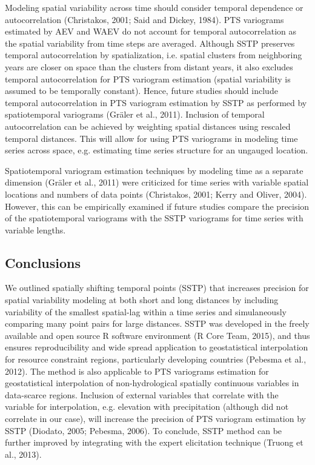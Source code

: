 Modeling spatial variability across time should consider temporal dependence or autocorrelation (Christakos, 2001; Said and Dickey, 1984). PTS variograms estimated by AEV and WAEV do not account for temporal autocorrelation as the spatial variability from time steps are averaged. Although SSTP preserves temporal autocorrelation by spatialization, i.e. spatial clusters from neighboring years are closer on space than the clusters from distant years, it also excludes temporal autocorrelation for PTS variogram estimation (spatial variability is assumed to be temporally constant). Hence, future studies should include temporal autocorrelation in PTS variogram estimation by SSTP as performed by spatiotemporal variograms (Gräler et al., 2011). Inclusion of temporal autocorrelation can be achieved by weighting spatial distances using rescaled temporal distances. This will allow for using PTS variograms in modeling time series across space, e.g. estimating time series structure for an ungauged location.

Spatiotemporal variogram estimation techniques by modeling time as a separate dimension (Gräler et al., 2011) were criticized for time series with variable spatial locations and numbers of data points (Christakos, 2001; Kerry and Oliver, 2004). However, this can be empirically examined if future studies compare the precision of the spatiotemporal variograms with the SSTP variograms for time series with variable lengths.


\subsection{Conclusions}
\label{Conclusions}

We outlined spatially shifting temporal points (SSTP) that increases precision for spatial variability modeling at both short and long distances by including variability of the smallest spatial-lag within a time series and simulaneously comparing many point pairs for large distances. SSTP was developed in the freely available and open source R software environment (R Core Team, 2015), and thus ensures reproducibility and wide spread application to geostatistical interpolation for resource constraint regions, particularly developing countries (Pebesma et al., 2012). The method is also applicable to PTS variograms estimation for geostatistical interpolation of non-hydrological spatially continuous variables in data-scarce regions. Inclusion of external variables that correlate with the variable for interpolation, e.g. elevation with precipitation (although did not correlate in our case), will increase the precision of PTS variogram estimation by SSTP (Diodato, 2005; Pebesma, 2006). To conclude, SSTP method can be further improved by integrating with the expert elicitation technique (Truong et al., 2013). 


